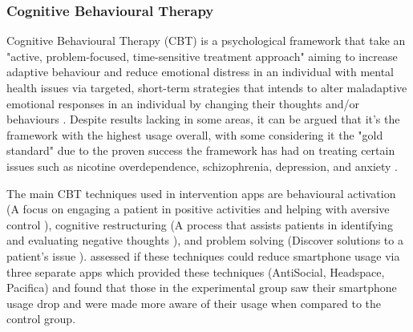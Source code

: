 \documentclass[12pt]{article}
\begin{document}
\subsubsection{Cognitive Behavioural Therapy}
Cognitive Behavioural Therapy (CBT) is a psychological framework that take an "active, problem-focused, 
time-sensitive treatment approach" aiming to increase adaptive 
behaviour and reduce emotional distress in an individual with mental health issues via targeted, short-term 
strategies that intends to alter maladaptive emotional responses in an individual by changing their thoughts and/or 
behaviours \autocite{RefWorks:RefID:138-wenzel2017basic,RefWorks:RefID:139-kaczkurkin2015cognitivebehavioral}.
Despite results lacking in some areas, it can be argued that it's the framework with the highest usage 
\autocite{RefWorks:RefID:140-hofmann2012efficacy} overall, with some considering it the "gold 
standard" \autocite{RefWorks:RefID:141-beck2020cognitive} due to the proven success the framework has had on 
treating certain issues such as nicotine overdependence, schizophrenia, 
depression, and anxiety \autocite{RefWorks:RefID:140-hofmann2012efficacy}. \newline

The main CBT techniques used in intervention apps are behavioural activation (A focus on engaging
a patient in positive activities and helping with aversive control 
\autocite{RefWorks:RefID:146-tindall2017behavioural}), cognitive restructuring (A process that assists patients 
in identifying and evaluating negative thoughts \autocite{RefWorks:RefID:138-wenzel2017basic}), and problem solving 
(Discover solutions to a patient's issue \autocite{RefWorks:RefID:144-denecke2022implementation}). 
\textcite{RefWorks:RefID:147-throuvala2020mind} assessed if these techniques could reduce smartphone 
usage via three separate apps which provided these techniques (AntiSocial, Headspace, Pacifica) and found that 
those in the experimental group saw their smartphone usage drop and were made more aware of their usage when 
compared to the control group.
\end{document}
